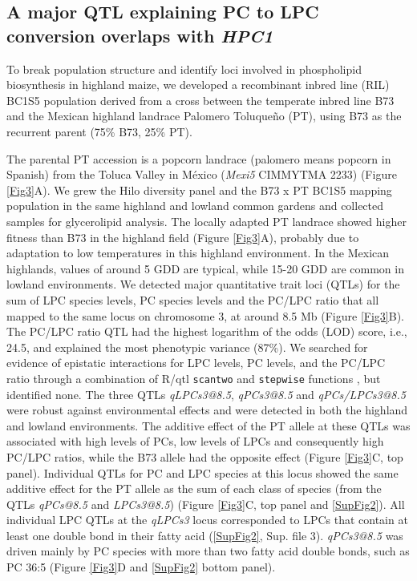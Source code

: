 \documentclass[9pt,twocolumn,twoside,lineno]{BioRxiv}
\def\code#1{\texttt{#1}}
\begin{document}
\subsection{A major QTL explaining PC to LPC conversion overlaps with \textit{HPC1}} 
To break population structure and identify loci involved in phospholipid biosynthesis in highland maize, we developed a recombinant inbred line (RIL) BC1S5 population derived from a cross between the temperate inbred line B73 and the Mexican highland landrace Palomero Toluqueño (PT), using B73 as the recurrent parent (75\% B73, 25\% PT). 

The parental PT accession is a popcorn landrace (palomero means popcorn in Spanish) from the Toluca Valley in México (\textit{Mexi5} CIMMYTMA 2233) (Figure \ref{Fig3}A). 
We grew the Hilo diversity panel and the B73 x PT BC1S5 mapping population in the same highland and lowland common gardens and collected samples for glycerolipid analysis.
The locally adapted PT landrace showed higher fitness than B73 in the highland field (Figure \ref{Fig3}A), probably due to adaptation to low temperatures in this highland environment.  
In the Mexican highlands, values of around 5 GDD are typical, while 15-20 GDD are common in lowland environments. 
We detected major quantitative trait loci (QTLs) for the sum of LPC species levels, PC species levels and the PC/LPC ratio that all mapped to the same locus on chromosome 3, at around 8.5 Mb (Figure \ref{Fig3}B). 
The PC/LPC ratio QTL had the highest logarithm of the odds (LOD) score, i.e., 24.5, and explained the most phenotypic variance (87\%). 
We searched for evidence of epistatic interactions for LPC levels, PC levels, and the PC/LPC ratio through a combination of R/qtl \code{scantwo} and \code{stepwise} functions \cite{Broman2003-ac}, but identified none.
The three QTLs \textit{qLPCs3@8.5}, \textit{qPCs3@8.5} and \textit{qPCs/LPCs3@8.5} were robust against environmental effects and were detected in both the highland and lowland environments.
The additive effect of the PT allele at these QTLs was associated with high levels of PCs, low levels of LPCs and consequently high PC/LPC ratios, while the B73 allele had the opposite effect (Figure \ref{Fig3}C, top panel).
Individual QTLs for PC and LPC species at this locus showed the same additive effect for the PT allele as the sum of each class of species (from the QTLs \textit{qPCs@8.5} and \textit{LPCs3@8.5}) (Figure \ref{Fig3}C, top panel and \ref{SupFig2}). 
All individual LPC QTLs at the \textit{qLPCs3} locus corresponded to LPCs that contain at least one double bond in their fatty acid (\ref{SupFig2}, Sup. file 3).
\textit{qPCs3@8.5} was driven mainly by PC species with more than two fatty acid double bonds, such as PC 36:5 (Figure \ref{Fig3}D and \ref{SupFig2} bottom panel).
\end{document}
